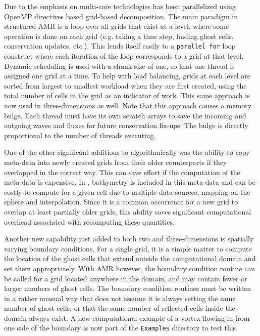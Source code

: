 Due to the emphasis on multi-core technologies \clawpack has been parallelized
using OpenMP directives based grid-based decomposition.  The main paradigm in
structured AMR is a loop over all grids that exist at a level, where some
operation is done on each grid (e.g. taking a time step, finding ghost cells,
conservation updates, etc.). This lends itself easily to a {\tt parallel for}
loop construct where  each iteration of the loop corresponds to a grid at that
level. Dynamic scheduling is used with a chunk size of one, so that one thread
is assigned one grid at a time.  To help with load balancing, grids at each
level are sorted from largest to smallest workload when they are first created,
using the total number of cells in the grid as an indicator of work. This same
approach is now used in three-dimensions as well.   Note that this approach
causes a memory bulge. Each thread must have its own scratch arrays to save the
incoming and outgoing waves and fluxes for future conservation fix-ups.  The
bulge is directly proportional to the number of threads executing.



One of the other significant additions to \amrclaw algorithmically was the
ability to copy meta-data into newly created grids from their older counterparts
if they overlapped in the correct way.  This can save effort if the computation
of the meta-data is expensive.  In \geoclaw, bathymetry is included in this
meta-data and can be costly to compute for a given cell due to multiple data
sources, mapping on the sphere and interpolation.  Since it is a common
occurrence for a new grid to overlap at least partially older grids, this
ability saves significant computational overhead associated with recomputing
these quantities.

Another new capability just added to both two and three-dimensions is spatially
varying boundary conditions.  For a single grid, it is a simple matter to
compute the location of the ghost cells that extend outside the computational
domain and set them appropriately. With AMR however, the boundary condition
routine can be called for a grid located anywhere in the domain, and may contain
fewer or larger numbers of ghost cells. The boundary condition routines must be
written in a rather unusual way that does not assume it is always setting the
same number of ghost cells, or that the same number of reflected cells inside
the domain always exist. A new computational example of a vortex flowing in from
one side of the boundary is now part of the {\tt Examples} directory to test
this.


